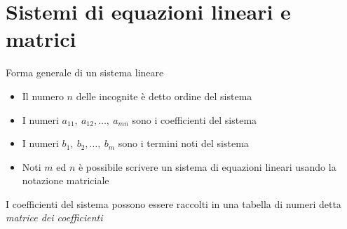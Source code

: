 \documentclass{beamer}
\begin{document}
\generatitolo

\section{Sistemi di equazioni lineari e matrici}

\begin{frame}[allowframebreaks]{Forma generale di un sistema lineare}
  

  \framebreak
  
  \begin{itemize}
  \item  Il numero $n$ delle incognite \`e detto ordine del sistema

  \item  I numeri $a_{11},\ a_{12}, \ldots,\ a_{mn}$  sono i coefficienti del sistema

  \item  I numeri $b_1,\ b_2, \ldots,\ b_m$ sono i termini noti del sistema
  
  \item  Noti $m$ ed $n$ \`e possibile scrivere un sistema di equazioni lineari usando
  la notazione matriciale
  \end{itemize}
  
  \framebreak
  
  I coefficienti del sistema possono essere raccolti in una tabella di numeri detta \emph{matrice dei coefficienti}


\end{frame}
\end{document}
